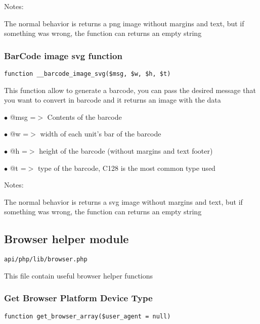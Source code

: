 \documentclass[a4paper]{article}
\begin{document}
Notes:

The normal behavior is returns a png image without margins and text,
but if something was wrong, the function can returns an empty string

\hypertarget{toc387}{}
\subsubsection{BarCode image svg function}

\begin{lstlisting}
function __barcode_image_svg($msg, $w, $h, $t)
\end{lstlisting}

This function allow to generate a barcode, you can pass the desired
message that you want to convert in barcode and it returns an image
with the data

\begin{compactitem}
\item[\color{myblue}$\bullet$] @msg =$>$ Contents of the barcode
\item[\color{myblue}$\bullet$] @w   =$>$ width of each unit's bar of the barcode
\item[\color{myblue}$\bullet$] @h   =$>$ height of the barcode (without margins and text footer)
\item[\color{myblue}$\bullet$] @t   =$>$ type of the barcode, C128 is the most common type used
\end{compactitem}

Notes:

The normal behavior is returns a svg image without margins and text,
but if something was wrong, the function can returns an empty string

\hypertarget{toc388}{}
\subsection{Browser helper module}

\begin{lstlisting}
api/php/lib/browser.php
\end{lstlisting}

This file contain useful browser helper functions

\hypertarget{toc389}{}
\subsubsection{Get Browser Platform Device Type}

\begin{lstlisting}
function get_browser_array($user_agent = null)
\end{lstlisting}
\end{document}
